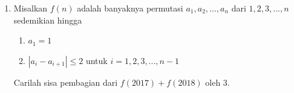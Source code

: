 \documentclass[11pt]{scrartcl}
\begin{document}
\begin{enumerate}
    \item Misalkan $f(n)$ adalah banyaknya permutasi $a_1,a_2,...,a_n$ dari $1,2,3,...,n$ sedemikian hingga 
        \begin{enumerate}
            \item $a_1 = 1$
            \item $|a_i - a_{i + 1}| \leq 2$ untuk $i = 1,2,3,...,n-1$
        \end{enumerate}
        Carilah sisa pembagian dari $f(2017) + f(2018)$ oleh 3.
\end{enumerate}
\end{document}
